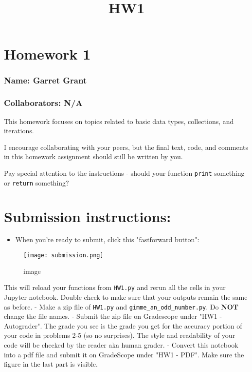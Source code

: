 \documentclass[11pt]{article}
\title{HW1}
\makeatletter
\def\maxwidth{\ifdim\Gin@nat@width>\linewidth\linewidth
    \else\Gin@nat@width\fi}
\let\Oldincludegraphics\includegraphics
\renewcommand{\includegraphics}[1]{\Oldincludegraphics[width=.8\maxwidth]{#1}}
\providecommand{\tightlist}{%
      \setlength{\itemsep}{0pt}\setlength{\parskip}{0pt}}
\makeatother
\begin{document}
    
    
    \maketitle
    
    

    
    \section{Homework 1}\label{homework-1}

\subsubsection{Name: Garret Grant}\label{name-garret-grant}

\subsubsection{Collaborators: N/A}\label{collaborators-na}

    This homework focuses on topics related to basic data types,
collections, and iterations.

I encourage collaborating with your peers, but the final text, code, and
comments in this homework assignment should still be written by you.

Pay special attention to the instructions - should your function
\texttt{print} something or \texttt{return} something?

\section{Submission instructions:}\label{submission-instructions}

\begin{itemize}
\tightlist
\item
  When you're ready to submit, click this "fastforward button":
\end{itemize}

\begin{figure}
\centering
\texttt{[image: submission.png]}
\caption{image}
\end{figure}

This will reload your functions from \texttt{HW1.py} and rerun all the
cells in your Jupyter notebook. Double check to make sure that your
outputs remain the same as before. - Make a zip file of \texttt{HW1.py}
and \texttt{gimme\_an\_odd\_number.py}. Do \textbf{NOT} change the file
names. - Submit the zip file on Gradescope under "HW1 - Autograder". The
grade you see is the grade you get for the accuracy portion of your code
in problems 2-5 (so no surprises). The style and readability of your
code will be checked by the reader aka human grader. - Convert this
notebook into a pdf file and submit it on GradeScope under "HW1 - PDF".
Make sure the figure in the last part is visible.
\end{document}
